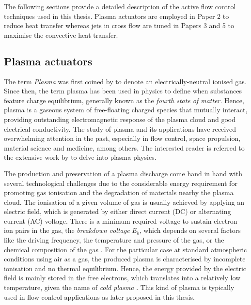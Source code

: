 The following sections provide a detailed description of the active flow control techniques used in this thesis. Plasma actuators are employed in Paper 2 to reduce heat transfer whereas jets in cross flow are tuned in Papers 3 and 5 to maximise the convective heat transfer.

\subsection{Plasma actuators}\label{ss:PA}

The term \textit{Plasma} was first coined by \citet{Langmuir1928plasma} to denote an electrically-neutral ionised gas. Since then, the term plasma has been used in physics to define when substances feature charge equilibrium, generally known as the \textit{fourth state of matter}. Hence, plasma is a gaseous system of free-floating charged species that mutually interact, providing outstanding electromagnetic response of the plasma cloud and good electrical conductivity. The study of plasma and its applications have received overwhelming attention in the past, especially in flow control, space propulsion, material science and medicine, among others. The interested reader is referred to the extensive work by \citet{fridman2008plasma} to delve into plasma physics.

The production and preservation of a plasma discharge come hand in hand with several technological challenges due to the considerable energy requirement for promoting gas ionisation and the degradation of materials nearby the plasma cloud. The ionisation of a given volume of gas is usually achieved by applying an electric field, which is generated by either direct current (DC) or alternating current (AC) voltage. There is a minimum required voltage to sustain electron-ion pairs in the gas, the \textit{breakdown voltage} $E_b$, which depends on several factors like the driving frequency, the temperature and pressure of the gas, or the chemical composition of the gas \citep{Kunhardt1980breakdown,kunhardt1983electrical}. For the particular case at standard atmospheric conditions using air as a gas, the produced plasma is characterised by incomplete ionisation and no thermal equilibrium. Hence, the energy provided by the electric field is mainly stored in the free electrons, which translates into a relatively low temperature, given the name of \textit{cold plasma} \citep{Yamamoto2007plasma}. This kind of plasma is typically used in flow control applications as later proposed in this thesis.

